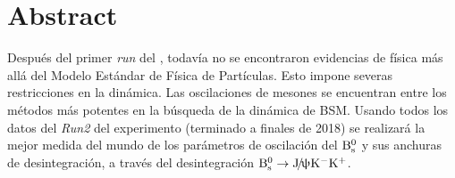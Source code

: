 \chapter{Abstract}

Después del primer \textit{run} 
del \lhc, 
todavía no se encontraron 
evidencias de física 
más allá del \color{vero} Modelo Estándar de Física de Partículas. \color{norm} 
Esto impone severas restricciones en la dinámica. 
Las oscilaciones de mesones se encuentran entre los métodos más potentes en la búsqueda de la dinámica de BSM. 
Usando todos los datos del \textit{Run2} del experimento \lhcb (terminado a finales de 2018) se realizará la mejor \color{vero} medida \color{norm} del mundo de los parámetros de oscilación del $\mathrm{B}{}_{\mathrm{s}}^{0}$ y sus anchuras de desintegración, a través del desintegración \color{vero} $\mathrm{B}{}_{\mathrm{s}}^{0} \rightarrow \mathrm{J}\!/\!\uppsi \mathrm{K}{}^{-} \mathrm{K}{}^{+}$. \color{norm}

